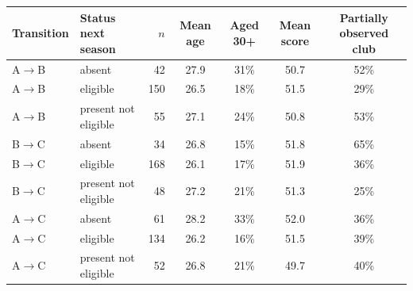 \begin{tabular}{llrcccc}
\toprule
Transition & Status next season & $n$ & Mean age & Aged 30+ & Mean score & Partially observed club \\
\midrule
A$\to$B & absent & 42 & 27.9 & 31\% & 50.7 & 52\% \\
A$\to$B & eligible & 150 & 26.5 & 18\% & 51.5 & 29\% \\
A$\to$B & present not eligible & 55 & 27.1 & 24\% & 50.8 & 53\% \\
B$\to$C & absent & 34 & 26.8 & 15\% & 51.8 & 65\% \\
B$\to$C & eligible & 168 & 26.1 & 17\% & 51.9 & 36\% \\
B$\to$C & present not eligible & 48 & 27.2 & 21\% & 51.3 & 25\% \\
A$\to$C & absent & 61 & 28.2 & 33\% & 52.0 & 36\% \\
A$\to$C & eligible & 134 & 26.2 & 16\% & 51.5 & 39\% \\
A$\to$C & present not eligible & 52 & 26.8 & 21\% & 49.7 & 40\% \\
\bottomrule
\end{tabular}
